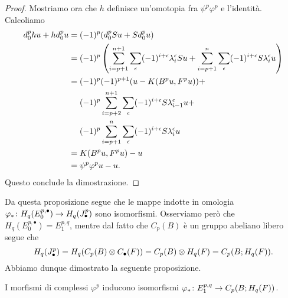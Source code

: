 \begin{proof}
Mostriamo ora che $h$ definisce un'omotopia fra $\psi^p\varphi^p$ e l'identità. Calcoliamo
\begin{align*}
d^p_0hu+hd^p_0u&=(-1)^p(d^p_0Su+Sd^p_0u)\\
&=(-1)^p\left(\sum_{i=p+1}^{n+1}\sum_\epsilon(-1)^{i+\epsilon}\lambda^\epsilon_iSu+\sum_{i=p+1}^n\sum_\epsilon(-1)^{i+\epsilon}S\lambda^\epsilon_iu\right)\\
&=(-1)^p(-1)^{p+1}(u-K(B^pu,F^pu))+\\
&\phantomop(-1)^p\sum_{i=p+2}^{n+1}\sum_\epsilon(-1)^{i+\epsilon}S\lambda^\epsilon_{i-1}u+\\
&\phantomop(-1)^p\sum_{i=p+1}^n\sum_\epsilon(-1)^{i+\epsilon}S\lambda^\epsilon_iu\\
&=K(B^pu,F^pu)-u\\
&=\psi^p\varphi^pu-u.
\end{align*}
Questo conclude la dimostrazione.
\end{proof}

Da questa proposizione segue che le mappe indotte in omologia $\varphi_*\colon H_q(E^{p,\bullet}_0)\to H_q(J^p_\bullet)$ sono isomorfismi. Osserviamo però che $H_q(E^{p,\bullet}_0)=E^{p,q}_1$, mentre dal fatto che $C_p(B)$ è un gruppo abeliano libero segue che
$$
H_q(J^p_\bullet)=H_q(C_p(B)\mathbin{\otimes} C_\bullet(F))=C_p(B)\mathbin{\otimes} H_q(F)=C_p(B;H_q(F)).
$$
Abbiamo dunque dimostrato la seguente proposizione.
\begin{proposition}
I morfismi di complessi $\varphi^p$ inducono isomorfismi $\varphi_*\colon E^{p,q}_1\to C_p(B;H_q(F))$.
\end{proposition}

